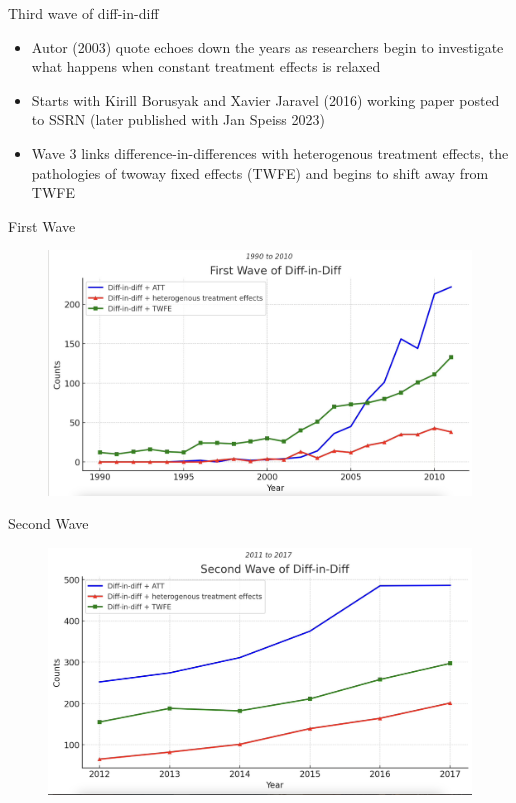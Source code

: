 \documentclass{beamer}
\begin{document}
\begin{frame}{Third wave of diff-in-diff}

\begin{itemize}

\item Autor (2003) quote echoes down the years as researchers begin to investigate what happens when constant treatment effects is relaxed
\item Starts with Kirill Borusyak and Xavier Jaravel (2016) working paper posted to SSRN (later published with Jan Speiss 2023)
\item Wave 3 links difference-in-differences with heterogenous treatment effects, the pathologies of twoway fixed effects (TWFE) and begins to shift away from TWFE
\end{itemize}

\end{frame}


\begin{frame}{First Wave}

	\begin{figure}
	\includegraphics[scale=0.15]{./lecture_includes/wave1}
	\end{figure}

\end{frame}


\begin{frame}{Second Wave}

	\begin{figure}
	\includegraphics[scale=0.15]{./lecture_includes/wave2}
	\end{figure}

\end{frame}
\end{document}
